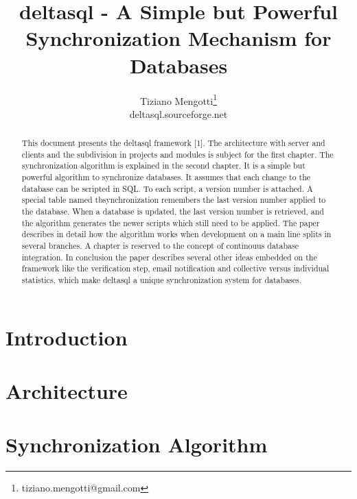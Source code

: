 \documentclass[10pt,a4paper]{article}
\begin{document}
\pagestyle{headings}

\title{deltasql - A Simple but Powerful Synchronization Mechanism for Databases}

\author{Tiziano Mengotti\thanks{tiziano.mengotti@gmail.com}\\
deltasql.sourceforge.net\\}

\maketitle
\thispagestyle{empty}

\begin{abstract}
This document presents the deltasql framework [1]. The architecture with server and clients and the subdivision in projects and modules is subject for the first chapter. The synchronization algorithm is explained in the second chapter. It is a simple but powerful algorithm to synchronize databases. It assumes that each change to the database can be scripted in SQL. To each script, a version number is attached. A special table named tbsynchronization remembers the last version number applied to the database. When a database is updated, the last version number is retrieved, and the algorithm generates the newer scripts which still need to be applied. The paper describes in detail how the algorithm works when development on a main line splits in several branches. A chapter is reserved to the concept of continouus database integration. In conclusion the paper describes several other ideas embedded on the framework like the verification step, email notification and collective versus individual statistics, which make deltasql a unique synchronization system for databases. 
\end{abstract}

\section{Introduction}
\label{sec:intro}



\section{Architecture}

\section{Synchronization Algorithm}
\end{document}
